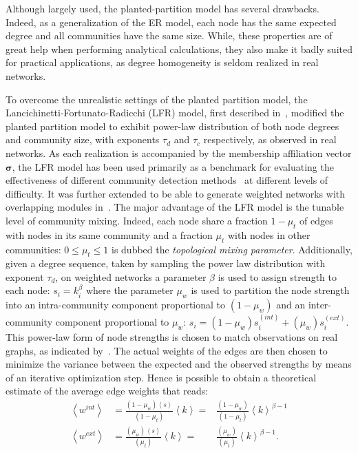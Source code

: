 Although largely used, the planted-partition model has several drawbacks.
Indeed, as a generalization of the ER model, each node has the same expected degree and all communities have the same size.
While, these properties are of great help when performing analytical calculations, they also make it badly suited for practical applications, as degree homogeneity is seldom realized in real networks.

To overcome the unrealistic settings of the planted partition model, the Lancichinetti\hyp{}Fortunato\hyp{}Radicchi (LFR) model, first described in~\cite{lancichinetti2008}, modified the planted partition model to exhibit power-law distribution of both node degrees and community size, with exponents $\tau_d$ and $\tau_c$ respectively, as observed in real networks.
As each realization is accompanied by the membership affiliation vector $\boldsymbol \sigma$, the LFR model has been used primarily as a benchmark for evaluating the effectiveness of different community detection methods~\cite{fortunato2010,lancichinetti2009} at different levels of difficulty. It was further extended to be able to generate weighted networks with overlapping modules in~\cite{lancichinetti2009a}.
The major advantage of the LFR model is the tunable level of community mixing. Indeed, each node share a fraction $1-\mu_t$ of edges with nodes in its same community and a fraction $\mu_t$ with nodes in other communities: $0 \leq \mu_t \leq 1$ is dubbed the \emph{topological mixing parameter}.
Additionally, given a degree sequence, taken by sampling the power law distribution with exponent $\tau_d$, on weighted networks a parameter $\beta$ is used to assign strength to each node: $s_i=k_i^\beta$ where the parameter $\mu_w$ is used to partition the node strength into an intra-community component proportional to $(1-\mu_w)$ and an inter-community component proportional to $\mu_w$: $s_i = (1-\mu_w)s_i^{(int)} + (\mu_w)s_i^{(ext)}$. This power-law form of node strengths is chosen to match observations on real graphs, as indicated by~\cite{barrat2004}.
The actual weights of the edges are then chosen to minimize the variance between the expected and the observed strengths by means of an iterative optimization step. Hence is possible to obtain a theoretical estimate of the average edge weights that reads:
\begin{align}
\left< w^{int} \right> &= \frac{(1-\mu_w)\left< s\right>}{(1-\mu_t)}\left< k\right> =& \frac{(1-\mu_w)}{(1-\mu_t)}\left < k \right>^{\beta-1} \\
\left< w^{ext} \right> &= \frac{(\mu_w)\left< s\right>}{(\mu_t)}\left< k\right> =& \frac{(\mu_w)}{(\mu_t)}\left < k \right>^{\beta-1}.
\end{align}
